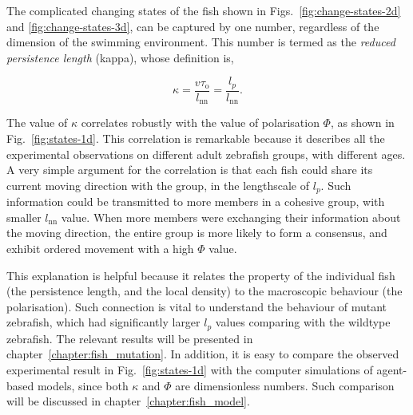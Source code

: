 \documentclass[11pt,twoside]{report}
\begin{document}
The complicated changing states of the fish shown in Figs.~\ref{fig:change-states-2d} and \ref{fig:change-states-3d}, can be captured by one number, regardless of the dimension of the swimming environment. This number is termed as the \emph{reduced persistence length} (\gls{kappa}), whose definition is,

\begin{equation}
	\kappa 
	= \frac{v \tau_\mathrm{o}}{l_\mathrm{nn}}
	= \frac{l_p}{l_\mathrm{nn}}	.
\label{eq:kappa}
\end{equation}

\noindent The value of $\kappa$ correlates robustly with the value of polarisation $\Phi$, as shown in Fig.~\ref{fig:states-1d}.
This correlation is remarkable because it describes all the experimental observations on different adult zebrafish groups, with different ages.
A very simple argument for the correlation is that each fish could share its current moving direction with the group, in the lengthscale of $l_p$. Such information could be transmitted to more members in a cohesive group, with smaller $l_\mathrm{nn}$ value. When more members were exchanging their information about the moving direction, the entire group is more likely to form a consensus, and exhibit ordered movement with a high $\Phi$ value.

This explanation is helpful because it relates the property of the individual fish (the persistence length, and the local density) to the macroscopic behaviour (the polarisation).
Such connection is vital to understand the behaviour of mutant zebrafish, which had significantly larger $l_p$ values comparing with the wildtype zebrafish. The relevant results will be presented in chapter~\ref{chapter:fish_mutation}.
In addition, it is easy to compare the observed experimental result in Fig.~\ref{fig:states-1d} with the computer simulations of agent-based models, since both $\kappa$ and $\Phi$ are dimensionless numbers. Such comparison will be discussed in chapter~\ref{chapter:fish_model}.
\end{document}
